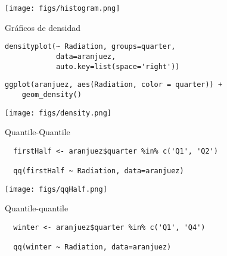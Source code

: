 \documentclass[aspectratio=169, usenames,svgnames,dvipsnames]{beamer}
\begin{document}
\begin{frame}[label={sec:orgb6da44b}]{}
\begin{center}
\texttt{[image: figs/histogram.png]}
\end{center}
\end{frame}

\begin{frame}[label={sec:org966ad70},fragile]{Gráficos de densidad}
 \lstset{language=r,label= ,caption= ,captionpos=b,numbers=none}
\begin{lstlisting}
densityplot(~ Radiation, groups=quarter,
            data=aranjuez,
            auto.key=list(space='right'))
\end{lstlisting}

\lstset{language=r,label= ,caption= ,captionpos=b,numbers=none}
\begin{lstlisting}
ggplot(aranjuez, aes(Radiation, color = quarter)) + 
    geom_density()
\end{lstlisting}
\end{frame}

\begin{frame}[label={sec:orge187a1d}]{}
\begin{center}
\texttt{[image: figs/density.png]}
\end{center}
\end{frame}

\begin{frame}[label={sec:org7fb68ac},fragile]{Quantile-Quantile}
 \lstset{language=r,label= ,caption= ,captionpos=b,numbers=none}
\begin{lstlisting}
  firstHalf <- aranjuez$quarter %in% c('Q1', 'Q2')
  
  qq(firstHalf ~ Radiation, data=aranjuez)
\end{lstlisting}
\end{frame}

\begin{frame}[label={sec:orgba0a355}]{}
\begin{center}
\texttt{[image: figs/qqHalf.png]}
\end{center}
\end{frame}

\begin{frame}[label={sec:org4f770a6},fragile]{Quantile-quantile}
 \lstset{language=r,label= ,caption= ,captionpos=b,numbers=none}
\begin{lstlisting}
  winter <- aranjuez$quarter %in% c('Q1', 'Q4')
  
  qq(winter ~ Radiation, data=aranjuez)
\end{lstlisting}
\end{frame}
\end{document}
